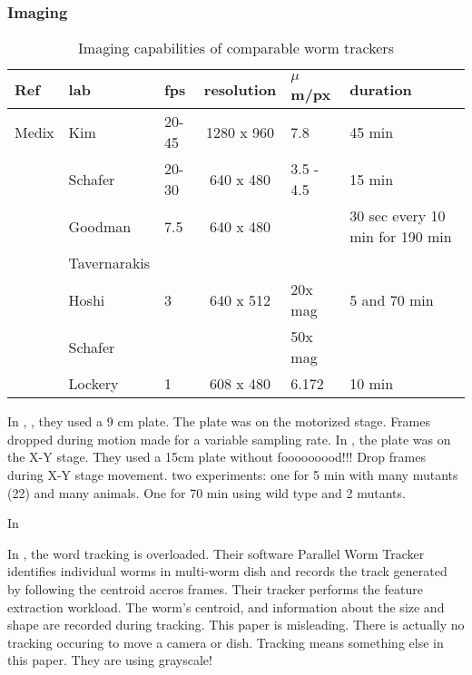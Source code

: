 \documentclass[main.tex]{subfiles}
\begin{document}
\subsubsection{Imaging}
\begin{table}[!htbp]
  \centering
  \begin{tabular}{lllcll}
\toprule
Ref                 & lab          & fps   & resolution & $\mu$m/px & duration                        \\
\midrule
Medix               & Kim          & 20-45 & 1280 x 960 & 7.8       & 45 min                          \\
\cite{yemini2013}   & Schafer      & 20-30 & 640 x 480  & 3.5 - 4.5 & 15 min                          \\
\cite{ramot2008}    & Goodman      & 7.5   & 640 x 480  &           & 30 sec every 10 min for 190 min \\
\cite{tsibidis2007} & Tavernarakis &       &            &           &                                 \\
\cite{hoshi2006}    & Hoshi        & 3     & 640 x 512  & 20x mag   & 5 and 70 min                    \\
\cite{geng2004}     & Schafer      &       &            & 50x mag   &                                 \\
\cite{pierce1999}   & Lockery      & 1     & 608 x 480  & 6.172     & 10 min                          \\ 
\bottomrule
  \end{tabular}
  \caption{Imaging capabilities of comparable worm trackers}
  \label{tab:trackers-img}
\end{table}


In \cite{pierce1999}, , they used a 9 cm plate. The plate was on the motorized stage. Frames dropped during motion made for a variable sampling rate. 
In \cite{hoshi2006}, the plate was on the X-Y stage. They used a 15cm plate without fooooooood!!! Drop frames during X-Y stage movement. two experiments: one for 5 min with many mutants (22) and many animals. One for 70 min using wild type and 2 mutants. 

In \cite{tsibidis2007}

In \cite{ramot2008}, the word tracking is overloaded. Their software Parallel Worm Tracker identifies individual worms in multi-worm dish and records the track generated by following the centroid accros frames. Their tracker performs the feature extraction workload. The worm's centroid, and information about the size and shape are recorded during tracking. This paper is misleading. There is actually no tracking occuring to move a camera or dish. Tracking means something else in this paper. They are using grayscale!
 
\end{document}
